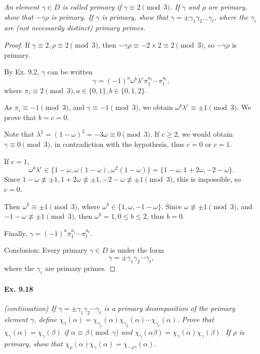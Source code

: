 \documentclass[11pt,a4paper]{article}
\begin{document}
{\it An element $\gamma \in D$ is called primary if $\gamma \equiv2 \pmod 3$. If $\gamma$ and $\rho$ are primary, show that $-\gamma \rho$ is primary. If $\gamma$ is primary, show that $\gamma = \pm \gamma_1\gamma_2\ldots \gamma_t$, where the $\gamma_i$ are (not necessarily distinct) primary primes.
}

\begin{proof}
If $\gamma \equiv 2, \rho \equiv 2 \pmod 3$, then $-\gamma \rho \equiv -2 \times 2 \equiv 2 \pmod 3$, so $-\gamma \rho$ is primary.

\bigskip

By Ex. 9.2, $\gamma$ can be  written 
$$\gamma = (-1)^a \omega^b \lambda^c \pi_1^{a_1}\cdots \pi_t^{a_t},$$
where $\pi_i \equiv 2 \pmod 3, a \in \{0,1\}, b \in \{0,1,2\}$.

As $\pi_i \equiv -1 \pmod 3$, and $\gamma \equiv -1 \pmod 3$, we obtain $\omega^b \lambda^c \equiv \pm 1 \pmod 3$. We prove that $b = c = 0$.

Note that $\lambda^2 = (1-\omega)^2 = -3\omega \equiv 0 \pmod 3$. If $c \geq 2$, we would obtain $\gamma \equiv 0 \pmod 3$, in contradiction with the hypothesis, thus $c = 0$ or $c = 1$.

If $c=1$, $$\omega^b\lambda^c \in \{1-\omega, \omega(1-\omega),\omega^2(1-\omega)\} = \{1 - \omega, 1+2\omega, - 2 - \omega\}.$$ Since $1-\omega \not \equiv \pm 1, 1+2\omega \not \equiv \pm 1, - 2 - \omega \not \equiv \pm 1 \pmod 3$, this is impossible, so $c=0$.

Then $\omega^b \equiv \pm 1 \pmod 3$, where $\omega^b \in \{1,\omega, -1-\omega\}$. Since $\omega \not \equiv \pm1 \pmod 3$, and $-1 - \omega \not \equiv \pm 1 \pmod 3$, then $\omega^b = 1, 0 \leq b \leq 2$, thus $b=0$.

Finally, $\gamma = (-1)^a \pi_1^{a_1}\cdots \pi_t^{a_t}$.

Conclusion: Every primary $\gamma \in D$ is under the form
$$\gamma = \pm \gamma_1\gamma_2\cdots \gamma_t,$$
where the $\gamma_i$ are primary primes.

\end{proof}

\paragraph{Ex. 9.18}

{\it (continuation) If $\gamma = \pm \gamma_1 \gamma_2\cdots \gamma_t$ is a primary decomposition of the primary element $\gamma$, define $\chi_{\gamma}(\alpha) = \chi_{\gamma_1}(\alpha)\chi_{\gamma_2}(\alpha)\cdots\chi_{\gamma_t}(\alpha)$. Prove that $\chi_{\gamma}(\alpha) = \chi_{\gamma}(\beta)$ if $\alpha \equiv \beta \pmod \gamma$ and $\chi_{\gamma}(\alpha \beta) = \chi_\gamma(\alpha) \chi_\gamma(\beta)$. If $\rho$ is primary, show that $\chi_\rho(\alpha) \chi_\gamma(\alpha) = \chi_{-\rho \gamma}(\alpha)$.
}
\end{document}
